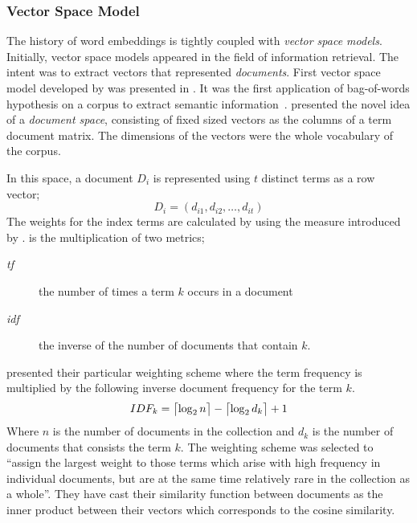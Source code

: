 \subsubsection{Vector Space Model}%
\label{ssub:vector_space_model}

The history of word embeddings is tightly coupled with \emph{vector space models}.
Initially, vector space models appeared in the field of information retrieval.
The intent was to extract vectors that represented \emph{documents}.
First vector space model developed by \textcite{salton_vector_1975} was presented in .
It was the first application of bag-of-words hypothesis on a corpus to extract semantic information~\cite{turney_frequency_2010}.
\citeauthor{salton_vector_1975} presented the novel idea of a \emph{document space}, consisting of fixed sized vectors as the columns of a term document matrix.
The dimensions of the vectors were the whole vocabulary of the corpus.

In this space, a document $D_i$ is represented using $t$ distinct terms as a row vector;
\begin{displaymath}
    D_{i} = (d_{i1}, d_{i2}, \ldots, d_{it})
\end{displaymath}
The weights for the index terms are calculated by using the \tfidf{} measure introduced by \textcite{jones_statistical_1972}.
\tfidf{} is the multiplication of two metrics;
\begin{description}
    \item[\emph{tf}] the number of times a term $k$ occurs in a document
    \item[\emph{idf}] the inverse of the number of documents that contain $k$.
\end{description}

\citeauthor{salton_vector_1975} presented their particular weighting scheme where the term frequency is multiplied by the following inverse document frequency for the term $k$.
\begin{displaymath}
IDF_{k} = \ceil[\big]{\log_{2}n} - \ceil[\big]{\log_{2}d_{k}} + 1
\end{displaymath}
Where $n$ is the number of documents in the collection and $d_k$ is the number of documents that consists the term $k$.
The weighting scheme was selected to \enquote{assign the largest weight to those terms which arise with high frequency in individual documents, but are at the same time relatively rare in the collection as a whole}.
They have cast their similarity function between documents as the inner product between their vectors which corresponds to the cosine similarity.

